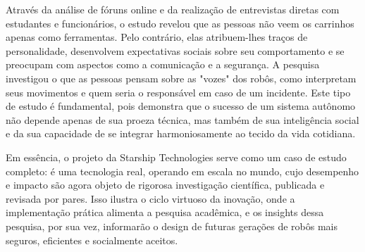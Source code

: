 Através da análise de fóruns online e da realização de entrevistas diretas com estudantes e funcionários, o estudo revelou que as pessoas não veem os carrinhos apenas como ferramentas. Pelo contrário, elas atribuem-lhes traços de personalidade, desenvolvem expectativas sociais sobre seu comportamento e se preocupam com aspectos como a comunicação e a segurança. A pesquisa investigou o que as pessoas pensam sobre as "vozes" dos robôs, como interpretam seus movimentos e quem seria o responsável em caso de um incidente. Este tipo de estudo é fundamental, pois demonstra que o sucesso de um sistema autônomo não depende apenas de sua proeza técnica, mas também de sua inteligência social e da sua capacidade de se integrar harmoniosamente ao tecido da vida cotidiana.

Em essência, o projeto da Starship Technologies serve como um caso de estudo completo: é uma tecnologia real, operando em escala no mundo, cujo desempenho e impacto são agora objeto de rigorosa investigação científica, publicada e revisada por pares. Isso ilustra o ciclo virtuoso da inovação, onde a implementação prática alimenta a pesquisa acadêmica, e os insights dessa pesquisa, por sua vez, informarão o design de futuras gerações de robôs mais seguros, eficientes e socialmente aceitos.






